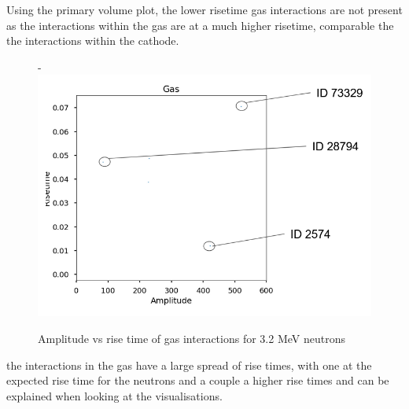 \documentclass[a4paper]{article}
\begin{document}
\noindent Using the primary volume plot, the lower risetime gas interactions are not present as the interactions within the gas are at a much higher risetime, comparable the the interactions within the cathode. 
\begin{figure}[H]-
        \centering
        \includegraphics[width=1\linewidth]{Fast/gas-id-3.PNG}
        \caption{Amplitude vs rise time of gas interactions for 3.2 MeV neutrons}
        \label{fig:south2d}
        \end{figure}
\noindent the interactions in the gas have a large spread of rise times, with one at the expected rise time for the neutrons and a couple a higher rise times and can be explained when looking at the visualisations.  
\end{document}
